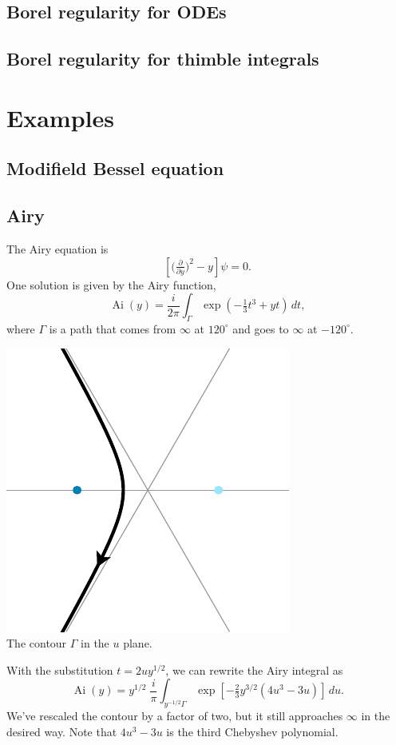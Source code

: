\documentclass{article}
\DeclareMathOperator{\Ai}{Ai}
\begin{document}
\subsection{Borel regularity for ODEs}
\subsection{Borel regularity for thimble integrals}


\section{Examples}

\subsection{Modifield Bessel equation}

\subsection{Airy}

The Airy equation is
\begin{equation}\label{eqn:airy}
\left[\big(\tfrac{\partial}{\partial y}\big)^2 - y\right] \psi = 0.
\end{equation}
One solution is given by the Airy function,
\[ \Ai(y) = \frac{i}{2\pi} \int_{\Gamma} \exp\left(-\tfrac{1}{3}t^3 + yt\right)\,dt, \]
where $\Gamma$ is a path that comes from $\infty$ at $120^\circ$ and goes to $\infty$ at $-120^\circ$.
\begin{center}
\includegraphics{figures/u_contour_3.pdf} \\[1em]
{\small The contour $\Gamma$ in the $u$ plane.}
\end{center}
With the substitution $t = 2uy^{1/2}$, we can rewrite the Airy integral as
\[ \Ai(y) = y^{1/2}\;\frac{i}{\pi} \int_{y^{-1/2} \Gamma} \exp\left[-\tfrac{2}{3}y^{3/2} \left(4u^3 - 3u\right)\right]\,du. \]
We've rescaled the contour by a factor of two, but it still approaches $\infty$ in the desired way. Note that $4u^3 - 3u$ is the third Chebyshev polynomial.
\end{document}
